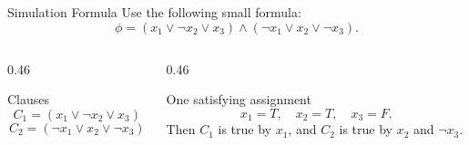 \documentclass[aspectratio=43,8pt]{beamer}
\begin{document}
\begin{frame}{Simulation Formula}
Use the following small formula:
\[
\phi=(x_1\vee \neg x_2\vee x_3)\land(\neg x_1\vee x_2\vee \neg x_3).
\]
\vspace{0.15cm}
\begin{columns}[T]
\begin{column}{0.46\textwidth}
\begin{block}{Clauses}
\[
C_1=(x_1\vee \neg x_2\vee x_3)
\]
\[
C_2=(\neg x_1\vee x_2\vee \neg x_3)
\]
\end{block}
\end{column}
\begin{column}{0.46\textwidth}
\begin{block}{One satisfying assignment}
\[
x_1=T,
\quad x_2=T,
\quad x_3=F.
\]
Then $C_1$ is true by $x_1$, and $C_2$ is true by $x_2$ and $\neg x_3$.
\end{block}
\end{column}
\end{columns}
\end{frame}
\end{document}
